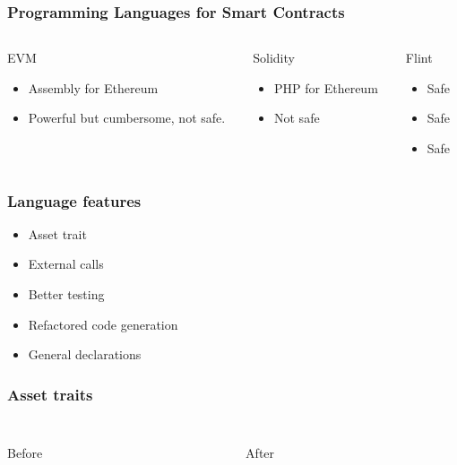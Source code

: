 \documentclass{beamer}
\begin{document}
\begin{frame}
\frametitle{Programming Languages for Smart Contracts}
\begin{columns}
\begin{column}{0.33\textwidth}
    \begin{block}{EVM}
    	\begin{itemize}
        \item Assembly for Ethereum
        \item Powerful but cumbersome, not safe.
        \end{itemize}
    \end{block}
\end{column}
\begin{column}{0.33\textwidth}
    \begin{block}{Solidity}
        \begin{itemize}
        \item PHP for Ethereum
        \item Not safe
        \end{itemize}
    \end{block}
\end{column}
\begin{column}{0.33\textwidth}
    \begin{block}{Flint}
    \begin{itemize}
    \item Safe
    \item Safe
    \item Safe
    \end{itemize}
    \end{block}
\end{column}

\end{columns}
\end{frame}

\begin{frame}
\frametitle{Language features}
\begin{itemize}
	\item Asset trait
	\item External calls
	\item Better testing
	\item Refactored code generation
	\item General declarations
\end{itemize}
\end{frame}

\begin{frame}\frametitle{Asset traits}
\begin{columns}
\begin{column}{0.5\textwidth}
	\inputminted[fontsize=\tiny]{swift}{code/asset-traits-before.flint}
	Before
\end{column}
\begin{column}{0.5\textwidth}
	\inputminted[fontsize=\tiny]{swift}{code/asset-traits-after.flint}
	After
\end{column}
\end{columns}
\end{frame}
\end{document}
